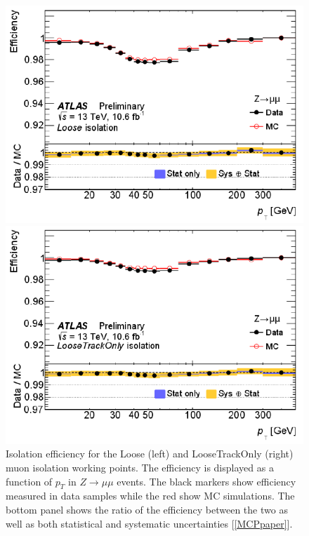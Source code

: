 \begin{figure}[!h]
  \centering
  \begin{minipage}[b]{0.47\textwidth}
    \includegraphics[width=\textwidth]{Pictures/isolationefficiency1.png}
  \end{minipage}
  \hspace{.2cm}
  \begin{minipage}[b]{0.48\textwidth}
    \includegraphics[width=\textwidth]{Pictures/isolationefficiency2.png}
  \end{minipage}
  \caption{Isolation efficiency for the Loose (left) and LooseTrackOnly (right) muon isolation working points. The efficiency is displayed as a function of $p_T$ in $Z \rightarrow \mu\mu$ events. The black markers show efficiency measured in data samples while the red show MC simulations. The bottom panel shows the ratio of the efficiency between the two as well as both  statistical and systematic uncertainties [\ref{MCPpaper}].}
  \label{fig:isolation}
\end{figure}

